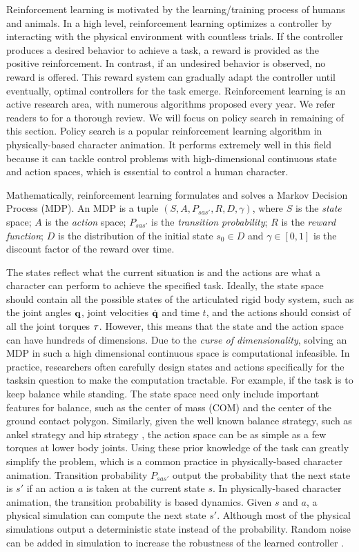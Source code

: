 Reinforcement learning is motivated by the learning/training process of humans and animals. In a high level, reinforcement learning optimizes a controller by interacting with the physical environment with countless trials. If the controller produces a desired behavior to achieve a task, a reward is provided as the positive reinforcement. In contrast, if an undesired behavior is observed, no reward is offered. This reward system can gradually adapt the controller until eventually, optimal controllers for the task emerge. Reinforcement learning is an active research area, with numerous algorithms proposed every year. We refer readers to \cite{} for a thorough review. We will focus on policy search in remaining of this section. Policy search is a popular reinforcement learning algorithm in physically-based character animation. It performs extremely well in this field because it can tackle control problems with high-dimensional continuous state and action spaces, which is essential to control a human character. 

Mathematically, reinforcement learning formulates and solves a Markov Decision Process (MDP). An MDP is a tuple $(S, A, P_{sas'}, R, D, \gamma)$, where $S$ is the \emph{state} space; $A$ is the \emph{action} space; $P_{sas'}$ is the \emph{transition probability}; $R$ is the \emph{reward function}; $D$ is the distribution of the initial state $s_0 \in D$ and $\gamma \in [0, 1]$ is the discount factor of the reward over time. 

The states reflect what the current situation is and the actions are what a character can perform to achieve the specified task. Ideally, the state space should contain all the possible states of the articulated rigid body system, such as the joint angles $\mathbf{q}$, joint velocities $\dot{\mathbf{q}}$ and time $t$, and the actions should consist of all the joint torques $\mathbf{\tau}$. However, this means that the state and the action space can have hundreds of dimensions. Due to the \emph{curse of dimensionality}, solving an MDP in such a high dimensional continuous space is computational infeasible. In practice, researchers often carefully design states and actions specifically for the tasksin question to make the computation tractable. For example, if the task is to keep balance while standing. The state space need only include important features for balance, such as the center of mass (COM) and the center of the ground contact polygon. Similarly, given the well known balance strategy, such as ankel strategy \cite{} and hip strategy \cite{}, the action space can be as simple as a few torques at lower body joints. Using these prior knowledge of the task can greatly simplify the problem, which is a common practice in physically-based character animation. Transition probability $P_{sas'}$ output the probability that the next state is $s'$ if an action $a$ is taken at the current state $s$. In physically-based character animation, the transition probability is based dynamics. Given $s$ and $a$, a physical simulation can compute the next state $s'$. Although most of the physical simulations output a deterministic state instead of the probability. Random noise can be added in simulation to increase the robustness of the learned controller \cite{}.

